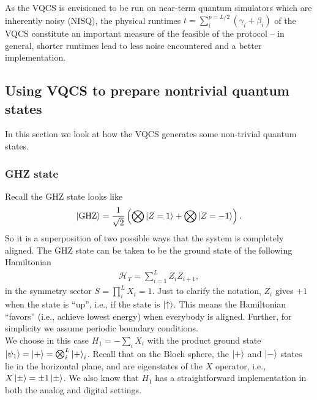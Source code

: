 \documentclass{book}
\theoremstyle{definition}
\newcommand{\had}{\mathcal{H}}
\newcommand{\f}[2]{\frac{#1}{#2}}
\newcommand{\lp}{\left(}
\newcommand{\rp}{\right)}
\begin{document}
As the VQCS is envisioned to be run on near-term quantum simulators which are inherently noisy (NISQ), the physical runtimes $t = \sum^{p=L/2}_i (\gamma_i + \beta_i)$ of the VQCS constitute an important measure of the feasible of the protocol -- in general, shorter runtimes lead to less noise encountered and a better implementation.  













\subsection{Using VQCS to prepare nontrivial quantum states}

In this section we look at how the VQCS generates some non-trivial quantum states.


\subsubsection{GHZ state}

Recall the GHZ state looks like
\begin{align}
\ket{\text{GHZ}} = \f{1}{\sqrt{2}}\lp \bigotimes \ket{Z=1} + \bigotimes \ket{Z = -1} \rp.
\end{align} 
So it is a superposition of two possible ways that the system is completely aligned. The GHZ state can be taken to be the ground state of the following Hamiltonian
\begin{align}
\had_T = \sum^L_{i=1}Z_i Z_{i+1},
\end{align}
in the symmetry sector $S = \prod^L_{i}X_i =1$. Just to clarify the notation, $Z_i$ gives $+1$ when the state is ``up'', i.e., if the state is $\ket{\uparrow}$. This means the Hamiltonian ``favors'' (i.e., achieve lowest energy) when everybody is aligned. Further, for simplicity we assume periodic boundary conditions.\\

We choose in this case $H_1 = -\sum_i X_i$ with the product ground state $\ket{\psi_1} = \ket{+} = \bigotimes^L_{i}\ket{+}_i$. Recall that on the Bloch sphere, the $\ket{+}$ and $\ket{-}$ states lie in the horizontal plane, and are eigenstates of the $X$ operator, i.e., $X\ket{\pm} = \pm 1 \ket{\pm}$. We also know that $H_1$ has a straightforward implementation in both the analog and digital settings. \\
\end{document}
